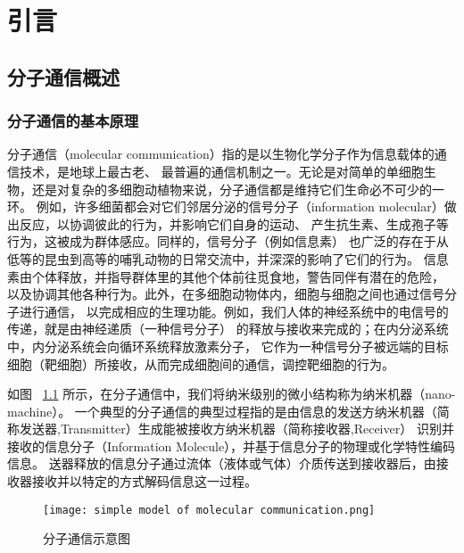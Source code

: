 


\chapter{引言}

\section{分子通信概述}
\subsection{分子通信的基本原理}
分子通信（molecular communication）指的是以生物化学分子作为信息载体的通信技术\cite{Hiyama2010Molecular}，是地球上最古老、
最普遍的通信机制之一。无论是对简单的单细胞生物，还是对复杂的多细胞动植物来说，分子通信都是维持它们生命必不可少的一环。
例如，许多细菌都会对它们邻居分泌的信号分子（information molecular）做出反应，以协调彼此的行为，并影响它们自身的运动、
产生抗生素、生成孢子等行为，这被成为群体感应。同样的，信号分子（例如信息素）
也广泛的存在于从低等的昆虫到高等的哺乳动物的日常交流中，并深深的影响了它们的行为。
信息素由个体释放，并指导群体里的其他个体前往觅食地，警告同伴有潜在的危险，
以及协调其他各种行为。此外，在多细胞动物体内，细胞与细胞之间也通过信号分子进行通信，
以完成相应的生理功能。例如，我们人体的神经系统中的电信号的传递，就是由神经递质（一种信号分子）
的释放与接收来完成的；在内分泌系统中，内分泌系统会向循环系统释放激素分子，
它作为一种信号分子被远端的目标细胞（靶细胞）所接收，从而完成细胞间的通信，调控靶细胞的行为。\cite{Atakan2014Molecular}

如图
~\ref{fig:molecular_communication_example}
所示，在分子通信中，我们将纳米级别的微小结构称为纳米机器（nano-machine）。
一个典型的分子通信的典型过程指的是由信息的发送方纳米机器（简称发送器,Transmitter）生成能被接收方纳米机器（简称接收器,Receiver）
识别并接收的信息分子（Information Molecule），并基于信息分子的物理或化学特性编码信息。
送器释放的信息分子通过流体（液体或气体）介质传送到接收器后，由接收器接收并以特定的方式解码信息这一过程。\cite{基于扩散的分子通信与身体域纳米网络}

\begin{figure}[ht]
    \centering
    \texttt{[image: simple model of molecular communication.png]}
    \caption{分子通信示意图\cite{compic}}
    \label{fig:molecular_communication_example}
\end{figure}

